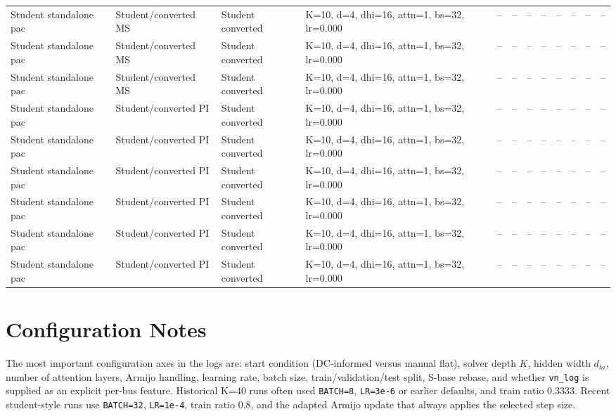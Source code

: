 \documentclass[10pt]{article}
\begin{document}
\begin{landscape}
\begin{longtable}{p{2.1cm}p{2.1cm}p{3.1cm}p{3.5cm}rrrrrrrr}
Student standalone pac & Student/converted MS & Student converted & K=10, d=4, dhi=16, attn=1, bs=32, lr=0.000 & -- & -- & -- & -- & -- & -- & -- & -- \\
Student standalone pac & Student/converted MS & Student converted & K=10, d=4, dhi=16, attn=1, bs=32, lr=0.000 & -- & -- & -- & -- & -- & -- & -- & -- \\
Student standalone pac & Student/converted MS & Student converted & K=10, d=4, dhi=16, attn=1, bs=32, lr=0.000 & -- & -- & -- & -- & -- & -- & -- & -- \\
Student standalone pac & Student/converted PI & Student converted & K=10, d=4, dhi=16, attn=1, bs=32, lr=0.000 & -- & -- & -- & -- & -- & -- & -- & -- \\
Student standalone pac & Student/converted PI & Student converted & K=10, d=4, dhi=16, attn=1, bs=32, lr=0.000 & -- & -- & -- & -- & -- & -- & -- & -- \\
Student standalone pac & Student/converted PI & Student converted & K=10, d=4, dhi=16, attn=1, bs=32, lr=0.000 & -- & -- & -- & -- & -- & -- & -- & -- \\
Student standalone pac & Student/converted PI & Student converted & K=10, d=4, dhi=16, attn=1, bs=32, lr=0.000 & -- & -- & -- & -- & -- & -- & -- & -- \\
Student standalone pac & Student/converted PI & Student converted & K=10, d=4, dhi=16, attn=1, bs=32, lr=0.000 & -- & -- & -- & -- & -- & -- & -- & -- \\
Student standalone pac & Student/converted PI & Student converted & K=10, d=4, dhi=16, attn=1, bs=32, lr=0.000 & -- & -- & -- & -- & -- & -- & -- & -- \\
\bottomrule
\end{longtable}
\end{landscape}


\section{Configuration Notes}
The most important configuration axes in the logs are: start condition (DC-informed versus manual flat), solver depth $K$, hidden width $d_{hi}$, number of attention layers, Armijo handling, learning rate, batch size, train/validation/test split, S-base rebase, and whether \texttt{vn\_log} is supplied as an explicit per-bus feature. Historical K=40 runs often used \texttt{BATCH=8}, \texttt{LR=3e-6} or earlier defaults, and train ratio 0.3333. Recent student-style runs use \texttt{BATCH=32}, \texttt{LR=1e-4}, train ratio 0.8, and the adapted Armijo update that always applies the selected step size.
\end{document}
